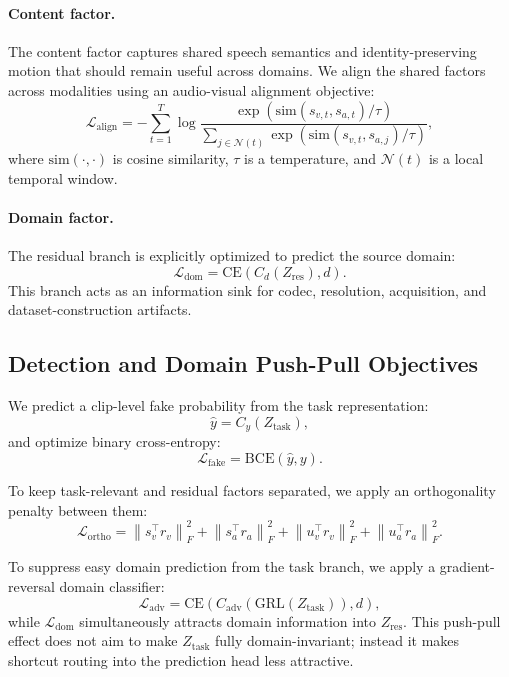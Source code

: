 \documentclass{article}
\begin{document}
\paragraph{Content factor.}
The content factor captures shared speech semantics and identity-preserving motion that should remain useful across domains. We align the shared factors across modalities using an audio-visual alignment objective:
\begin{equation}
\mathcal{L}_{\mathrm{align}} = - \sum_{t=1}^T
\log
\frac{\exp(\mathrm{sim}(s_{v,t}, s_{a,t})/\tau)}
{\sum_{j \in \mathcal{N}(t)} \exp(\mathrm{sim}(s_{v,t}, s_{a,j})/\tau)},
\end{equation}
where $\mathrm{sim}(\cdot,\cdot)$ is cosine similarity, $\tau$ is a temperature, and $\mathcal{N}(t)$ is a local temporal window.

\paragraph{Domain factor.}
The residual branch is explicitly optimized to predict the source domain:
\begin{equation}
\mathcal{L}_{\mathrm{dom}} = \mathrm{CE}(C_d(Z_{\mathrm{res}}), d).
\end{equation}
This branch acts as an information sink for codec, resolution, acquisition, and dataset-construction artifacts.

\subsection{Detection and Domain Push-Pull Objectives}

We predict a clip-level fake probability from the task representation:
\begin{equation}
\hat{y} = C_y(Z_{\mathrm{task}}),
\end{equation}
and optimize binary cross-entropy:
\begin{equation}
\mathcal{L}_{\mathrm{fake}} = \mathrm{BCE}(\hat{y}, y).
\end{equation}

To keep task-relevant and residual factors separated, we apply an orthogonality penalty between them:
\begin{equation}
\mathcal{L}_{\mathrm{ortho}} =
\left\| s_v^\top r_v \right\|_F^2
+ \left\| s_a^\top r_a \right\|_F^2
+ \left\| u_v^\top r_v \right\|_F^2
+ \left\| u_a^\top r_a \right\|_F^2.
\end{equation}

To suppress easy domain prediction from the task branch, we apply a gradient-reversal domain classifier:
\begin{equation}
\mathcal{L}_{\mathrm{adv}} =
\mathrm{CE}(C_{\mathrm{adv}}(\mathrm{GRL}(Z_{\mathrm{task}})), d),
\end{equation}
while $\mathcal{L}_{\mathrm{dom}}$ simultaneously attracts domain information into $Z_{\mathrm{res}}$. This push-pull effect does not aim to make $Z_{\mathrm{task}}$ fully domain-invariant; instead it makes shortcut routing into the prediction head less attractive.
\end{document}
